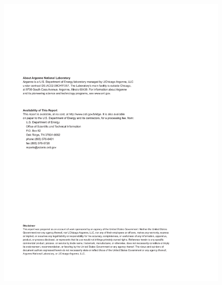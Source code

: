 \documentclass[twoside,11pt]{../sty/report_petsc}
\begin{document}
\begin{figure}[hbt]
\centerline{\includegraphics{titlepage2}}
\end{figure}

\end{document}
